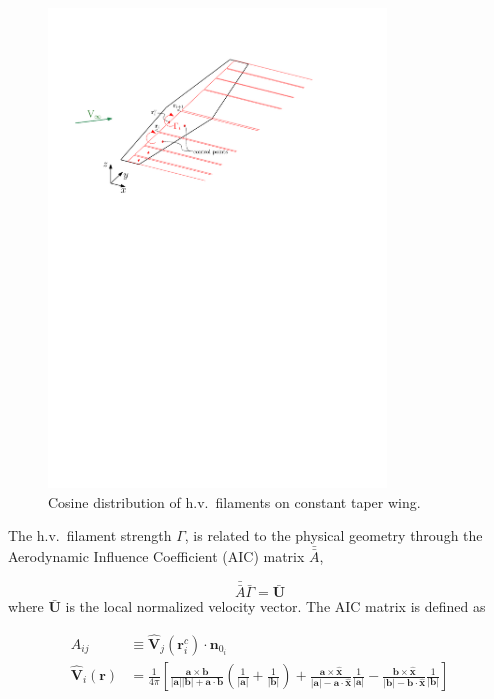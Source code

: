 \documentclass[10pt, a4paper]{article}
\begin{document}
\begin{figure}[h!]
	\begin{center}
	\includegraphics[width=0.8\textwidth]{wvl.pdf}
    \caption{Cosine distribution of h.v.\ filaments on constant taper wing.}
\label{f:wvl}
\end{center}
\end{figure}

The h.v.\ filament strength $\Gamma$, is related to the physical geometry through the Aerodynamic Influence Coefficient (AIC) matrix $\bar{\bar{A}}$, 

\begin{equation}
    \bar{\bar{A}} \bar{\Gamma} = \bar{\mathbf{U}}
\end{equation}
where $\bar{\mathbf{U}}$ is the local normalized velocity vector. The AIC matrix is defined as 

\begin{align}
    A_{ij} &\equiv \hat{\mathbf{V}}_j (\mathbf{r}_i^c) \cdot \bm{n}_{0_i} \\
    \hat{\mathbf{V}}_i (\mathbf{r}) &= \frac{1}{4\pi} \left[ \frac{\mathbf{a} \times \mathbf{b}}{|\mathbf{a}| |\mathbf{b}| + \mathbf{a} \cdot \mathbf{b}} \left( \frac{1}{|\mathbf{a}|} + \frac{1}{|\mathbf{b}|}\right) + \frac{\mathbf{a} \times \hat{\mathbf{x}}}{|\mathbf{a}| - \mathbf{a} \cdot \hat{\mathbf{x}}} \frac{1}{|\mathbf{a}|} - \frac{\mathbf{b} \times \hat{\mathbf{x}}}{|\mathbf{b}| - \mathbf{b} \cdot \hat{\mathbf{x}}} \frac{1}{|\mathbf{b}|} \right]
\end{align}
\end{document}

